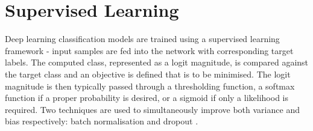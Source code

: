 
\section{Supervised Learning}

Deep learning classification models are trained using a supervised learning framework - input samples are fed into the network with corresponding target labels. The computed class, represented as a logit magnitude, is compared against the target class and an objective is defined that is to be minimised. The logit magnitude is then typically passed through a thresholding function, a softmax function \cite{reference} if a proper probability is desired, or a sigmoid \cite{reference} if only a likelihood is required. Two techniques are used to simultaneously improve both variance and bias respectively: batch normalisation \cite{reference} and dropout \cite{reference}. \newline 
